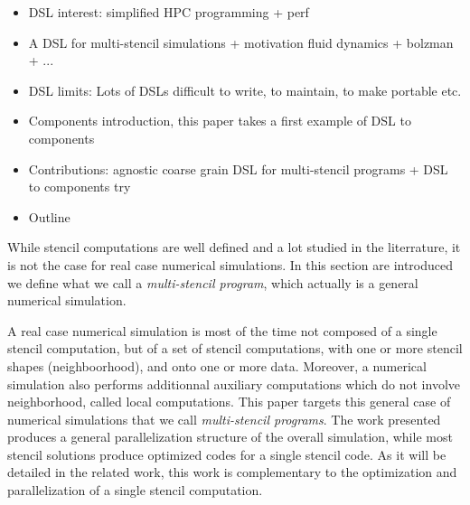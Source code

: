 \begin{itemize}
\item DSL interest: simplified HPC programming + perf
\item A DSL for multi-stencil simulations + motivation fluid dynamics + bolzman + ...
\item DSL limits: Lots of DSLs difficult to write, to maintain, to make portable etc.
\item Components introduction, this paper takes a first example of DSL to components
\item Contributions: agnostic coarse grain DSL for multi-stencil programs + DSL to components try
\item Outline
\end{itemize}

While stencil computations are well defined and a lot studied in the literrature, it is not the case for real case numerical simulations. In this section are introduced  we define what we call a \emph{multi-stencil program}, which actually is a general numerical simulation. 

A real case numerical simulation is most of the time not composed of a single stencil computation, but of a set of stencil computations, with one or more stencil shapes (neighboorhood), and onto one or more data. Moreover, a numerical simulation also performs additionnal auxiliary computations which do not involve neighborhood, called local computations. This paper targets this general case of numerical simulations that we call \emph{multi-stencil programs}. The work presented produces a general parallelization structure of the overall simulation, while most stencil solutions produce optimized codes for a single stencil code. As it will be detailed in the related work, this work is complementary to the optimization and parallelization of a single stencil computation.
